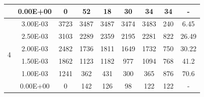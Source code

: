 \begin{table}[H]
{\begin{tabular}{|c|c|c|c|c|c|c|c|c|}
                               & 0.00E+00         & 0         & 52                                                         & 18                                                        & 30                                                        & 34      & 34     & -                                                                  \\ \hline
            \multirow{6}{*}{4} & 3.00E-03         & 3723      & 3487                                                       & 3487                                                      & 3474                                                      & 3483    & 240    & 6.45                                                               \\ \cline{2-9}
                               & 2.50E-03         & 3103      & 2289                                                       & 2359                                                      & 2195                                                      & 2281    & 822    & 26.49                                                              \\ \cline{2-9}
                               & 2.00E-03         & 2482      & 1736                                                       & 1811                                                      & 1649                                                      & 1732    & 750    & 30.22                                                              \\ \cline{2-9}
                               & 1.50E-03         & 1862      & 1123                                                       & 1182                                                      & 977                                                       & 1094    & 768    & 41.2                                                               \\ \cline{2-9}
                               & 1.00E-03         & 1241      & 362                                                        & 431                                                       & 300                                                       & 365     & 876    & 70.6                                                               \\ \cline{2-9}
                               & 0.00E+00         & 0         & 142                                                        & 126                                                       & 98                                                        & 122     & 122    & -                                                                  \\ \hline

\end{tabular}}
\end{table}
